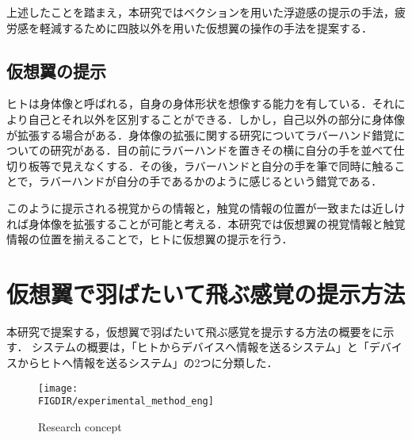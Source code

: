 \begin{small}

    上述したことを踏まえ，本研究ではベクションを用いた浮遊感の提示の手法，疲労感を軽減するために四肢以外を用いた仮想翼の操作の手法を提案する．

  \subsection{仮想翼の提示}
    ヒトは身体像と呼ばれる，自身の身体形状を想像する能力を有している．それにより自己とそれ以外を区別することができる．しかし，自己以外の部分に身体像が拡張する場合がある．身体像の拡張に関する研究についてラバーハンド錯覚についての研究がある\cite{botvinick1998rubber}．目の前にラバーハンドを置きその横に自分の手を並べて仕切り板等で見えなくする．その後，ラバーハンドと自分の手を筆で同時に触ることで，ラバーハンドが自分の手であるかのように感じるという錯覚である．
    
    このように提示される視覚からの情報と，触覚の情報の位置が一致または近しければ身体像を拡張することが可能と考える．本研究では仮想翼の視覚情報と触覚情報の位置を揃えることで，ヒトに仮想翼の提示を行う．  



  

\section{仮想翼で羽ばたいて飛ぶ感覚の提示方法}
  本研究で提案する，仮想翼で羽ばたいて飛ぶ感覚を提示する方法の概要をに示す．
  システムの概要は，「ヒトからデバイスへ情報を送るシステム」と「デバイスからヒトへ情報を送るシステム」の2つに分類した．
  
  \begin{figure}[t]
    \begin{center}
      \texttt{[image: \\FIGDIR/experimental\_method\_eng]}%
      \caption{Research concept}
    \end{center}
  \end{figure}


\end{small}
